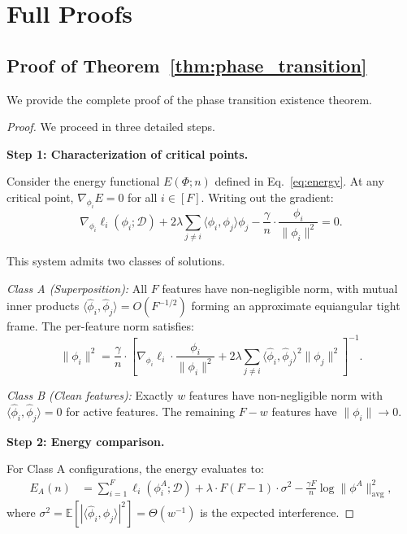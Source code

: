 \documentclass{article}
\newcommand{\expect}{\mathbb{E}}
\newcommand{\feat}{\phi}
\newcommand{\data}{\mathcal{D}}
\newcommand{\Fnum}{F}
\begin{document}
\section{Full Proofs}
\label{app:proofs}

\subsection{Proof of Theorem~\ref{thm:phase_transition}}

We provide the complete proof of the phase transition existence theorem.

\begin{proof}
We proceed in three detailed steps.

\textbf{Step 1: Characterization of critical points.}

Consider the energy functional $E(\Phi; n)$ defined in Eq.~\eqref{eq:energy}.
At any critical point, $\nabla_{\feat_i} E = 0$ for all $i \in [\Fnum]$.
Writing out the gradient:
\begin{equation}
\nabla_{\feat_i} \ell_i(\feat_i; \data) + 2\lambda \sum_{j \neq i} \langle \feat_i, \feat_j \rangle \feat_j - \frac{\gamma}{n} \cdot \frac{\feat_i}{\|\feat_i\|^2} = 0.
\end{equation}

This system admits two classes of solutions.

\emph{Class A (Superposition):} All $\Fnum$ features have non-negligible norm, with mutual inner products $\langle \hat{\feat}_i, \hat{\feat}_j \rangle = O(\Fnum^{-1/2})$ forming an approximate equiangular tight frame.
The per-feature norm satisfies:
\begin{equation}
\|\feat_i\|^2 = \frac{\gamma}{n} \cdot \left[\nabla_{\feat_i} \ell_i \cdot \frac{\feat_i}{\|\feat_i\|^2} + 2\lambda \sum_{j \neq i} \langle \hat{\feat}_i, \hat{\feat}_j \rangle^2 \|\feat_j\|^2\right]^{-1}.
\end{equation}

\emph{Class B (Clean features):} Exactly $w$ features have non-negligible norm with $\langle \hat{\feat}_i, \hat{\feat}_j \rangle = 0$ for active features.
The remaining $\Fnum - w$ features have $\|\feat_i\| \to 0$.

\textbf{Step 2: Energy comparison.}

For Class A configurations, the energy evaluates to:
\begin{align}
E_A(n) &= \sum_{i=1}^{\Fnum} \ell_i(\feat_i^A; \data) + \lambda \cdot \Fnum(\Fnum-1) \cdot \sigma^2 - \frac{\gamma \Fnum}{n} \log \|\feat^A\|^2_{\text{avg}},
\end{align}
where $\sigma^2 = \expect[|\langle \hat{\feat}_i, \hat{\feat}_j \rangle|^2] = \Theta(w^{-1})$ is the expected interference.


\end{proof}
\end{document}
